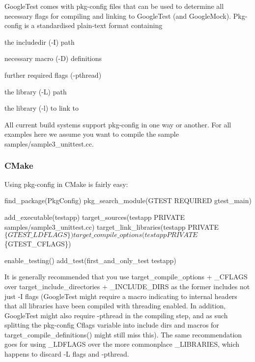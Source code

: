 Google\+Test comes with pkg-\/config files that can be used to determine all necessary flags for compiling and linking to Google\+Test (and Google\+Mock). Pkg-\/config is a standardised plain-\/text format containing


\begin{DoxyItemize}
\item the includedir (-\/I) path
\item necessary macro (-\/D) definitions
\item further required flags (-\/pthread)
\item the library (-\/L) path
\item the library (-\/l) to link to
\end{DoxyItemize}

All current build systems support pkg-\/config in one way or another. For all examples here we assume you want to compile the sample {\ttfamily samples/sample3\+\_\+unittest.\+cc}.

\subsubsection*{C\+Make}

Using {\ttfamily pkg-\/config} in C\+Make is fairly easy\+:


\begin{DoxyCode}
find\_package(PkgConfig)
pkg\_search\_module(GTEST REQUIRED gtest\_main)

add\_executable(testapp)
target\_sources(testapp PRIVATE samples/sample3\_unittest.cc)
target\_link\_libraries(testapp PRIVATE $\{GTEST\_LDFLAGS\})
target\_compile\_options(testapp PRIVATE $\{GTEST\_CFLAGS\})

enable\_testing()
add\_test(first\_and\_only\_test testapp)
\end{DoxyCode}


It is generally recommended that you use {\ttfamily target\+\_\+compile\+\_\+options} + {\ttfamily \+\_\+\+C\+F\+L\+A\+GS} over {\ttfamily target\+\_\+include\+\_\+directories} + {\ttfamily \+\_\+\+I\+N\+C\+L\+U\+D\+E\+\_\+\+D\+I\+RS} as the former includes not just -\/I flags (Google\+Test might require a macro indicating to internal headers that all libraries have been compiled with threading enabled. In addition, Google\+Test might also require {\ttfamily -\/pthread} in the compiling step, and as such splitting the pkg-\/config {\ttfamily Cflags} variable into include dirs and macros for {\ttfamily target\+\_\+compile\+\_\+definitions()} might still miss this). The same recommendation goes for using {\ttfamily \+\_\+\+L\+D\+F\+L\+A\+GS} over the more commonplace {\ttfamily \+\_\+\+L\+I\+B\+R\+A\+R\+I\+ES}, which happens to discard {\ttfamily -\/L} flags and {\ttfamily -\/pthread}.

